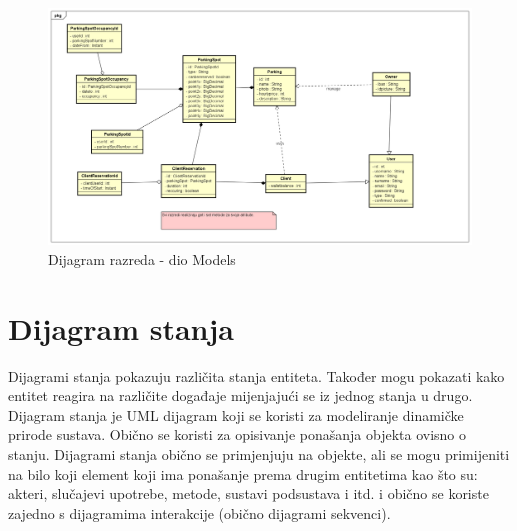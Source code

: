 \begin{figure}[H]
		\includegraphics[width=\textwidth]{slike/ClassDiagramModel.png} %
	\centering
	\caption{Dijagram razreda - dio Models}
	\label{fig:models}
\end{figure}

\eject



\section{Dijagram stanja}

Dijagrami stanja pokazuju različita stanja entiteta. 
Također mogu pokazati kako entitet reagira na različite događaje mijenjajući se iz jednog stanja u drugo. 
Dijagram stanja je UML dijagram koji se koristi za modeliranje dinamičke prirode sustava.
Obično se koristi za opisivanje ponašanja objekta ovisno o stanju. 
Dijagrami stanja obično se primjenjuju na objekte, ali se mogu primijeniti na bilo koji element koji ima ponašanje prema drugim entitetima kao što su: akteri, slučajevi upotrebe, metode, sustavi podsustava i itd. i obično se koriste zajedno s dijagramima interakcije (obično dijagrami sekvenci).

